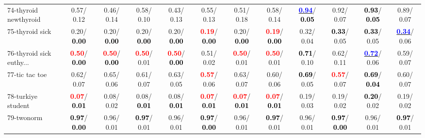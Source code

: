 \begin{table}[h]
\begin{center}
{\begin{tabular}{lc|c|c|c|c|c|c|c|c|c|c}
74-thyroid newthyroid &   0.57/  0.12 &   0.46/  0.14 &   0.58/  0.10 &   0.43/  0.13 &   0.55/  0.13 &   0.51/  0.18 &   0.58/  0.14 & \underline{\textcolor{blue}{\textbf{  0.94}}}/\textcolor{black}{\textbf{  0.05}} &   0.92/  0.07 & \textcolor{black}{\textbf{  0.93}}/\textcolor{black}{\textbf{  0.05}} &   0.89/  0.07 \\
75-thyroid sick &   0.20/\textcolor{black}{\textbf{  0.00}} &   0.20/\textcolor{black}{\textbf{  0.00}} &   0.20/\textcolor{black}{\textbf{  0.00}} &   0.20/\textcolor{black}{\textbf{  0.00}} & \textcolor{red}{\textbf{  0.19}}/\textcolor{black}{\textbf{  0.00}} &   0.20/\textcolor{black}{\textbf{  0.00}} & \textcolor{red}{\textbf{  0.19}}/\textcolor{black}{\textbf{  0.00}} &   0.32/  0.04 & \textcolor{black}{\textbf{  0.33}}/  0.05 & \textcolor{black}{\textbf{  0.33}}/  0.05 & \underline{\textcolor{blue}{\textbf{  0.34}}}/  0.06 \\
76-thyroid sick euthy... & \textcolor{red}{\textbf{  0.50}}/\textcolor{black}{\textbf{  0.00}} & \textcolor{red}{\textbf{  0.50}}/\textcolor{black}{\textbf{  0.00}} & \textcolor{red}{\textbf{  0.50}}/  0.01 & \textcolor{red}{\textbf{  0.50}}/\textcolor{black}{\textbf{  0.00}} &   0.51/  0.02 & \textcolor{red}{\textbf{  0.50}}/  0.01 & \textcolor{red}{\textbf{  0.50}}/  0.01 & \textcolor{black}{\textbf{  0.71}}/  0.10 &   0.62/  0.11 & \underline{\textcolor{blue}{\textbf{  0.72}}}/  0.06 &   0.59/  0.07 \\
77-tic tac toe &   0.62/  0.07 &   0.65/  0.06 &   0.61/  0.07 &   0.63/  0.05 & \textcolor{red}{\textbf{  0.57}}/  0.06 &   0.63/  0.07 &   0.60/  0.06 & \textcolor{black}{\textbf{  0.69}}/  0.05 & \textcolor{red}{\textbf{  0.57}}/  0.07 & \textcolor{black}{\textbf{  0.69}}/\textcolor{black}{\textbf{  0.04}} &   0.60/  0.07 \\
78-turkiye student & \textcolor{red}{\textbf{  0.07}}/\textcolor{black}{\textbf{  0.01}} &   0.08/  0.02 &   0.08/\textcolor{black}{\textbf{  0.01}} &   0.08/\textcolor{black}{\textbf{  0.01}} & \textcolor{red}{\textbf{  0.07}}/\textcolor{black}{\textbf{  0.01}} & \textcolor{red}{\textbf{  0.07}}/\textcolor{black}{\textbf{  0.01}} & \textcolor{red}{\textbf{  0.07}}/\textcolor{black}{\textbf{  0.01}} &   0.19/  0.03 &   0.19/  0.02 & \textcolor{black}{\textbf{  0.20}}/  0.02 &   0.19/  0.02 \\ \hline
79-twonorm & \textcolor{black}{\textbf{  0.97}}/\textcolor{black}{\textbf{  0.00}} &   0.96/  0.01 & \textcolor{black}{\textbf{  0.97}}/  0.01 &   0.96/  0.01 & \textcolor{black}{\textbf{  0.97}}/\textcolor{black}{\textbf{  0.00}} &   0.96/  0.01 & \textcolor{black}{\textbf{  0.97}}/  0.01 &   0.96/  0.01 & \textcolor{black}{\textbf{  0.97}}/\textcolor{black}{\textbf{  0.00}} &   0.96/  0.01 & \textcolor{black}{\textbf{  0.97}}/  0.01 \\

\end{tabular}}
\end{center}
\end{table}
